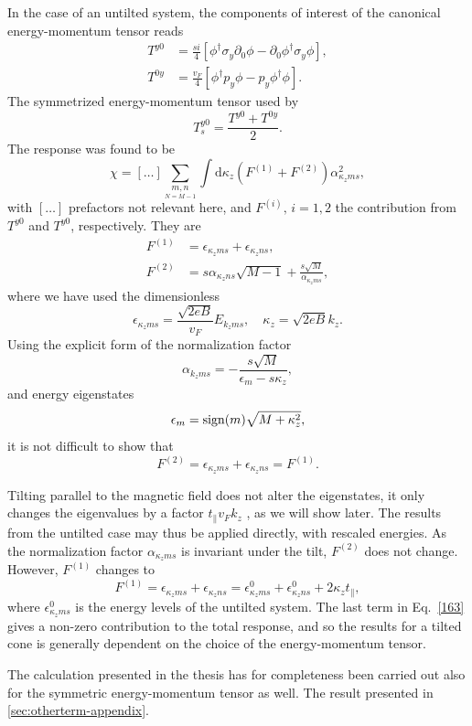 In the case of an untilted system, the components of interest of the canonical energy-momentum tensor reads
\begin{subequations}
\begin{align}
  T^{y 0} &= \frac{s i}{4}
  \left[
  \phi^{\dagger} \sigma_y \partial_{0} \phi - \partial_0 \phi^{\dagger} \sigma_y \phi
  \right],\\
  T^{0 y} &= \frac{v_F}{4}
  \left[
  \phi^{\dagger} p_y \phi - p_y \phi^{\dagger} \phi
  \right].
\end{align}
\end{subequations}
The symmetrized energy-momentum tensor used by \textcite{arjonaFingerprintsConformalAnomaly2019}
\begin{equation}
  T_s^{y 0} = \frac{T^{y 0} + T^{0 y}}{2}.
\end{equation}
The response was found to be
\begin{equation}
  \chi = [\dots] \sum\limits_{\underset{N=M-1}{m,n}}^{} \int \mathrm{d} \kappa_z (F^{(1)} + F^{(2)}) \alpha_{\kappa_z m s}^2,
\end{equation}
with \( [\dots] \) prefactors not relevant here, and \( F^{(i)},\, i=1,2 \) the contribution from \( T^{y0} \) and \( T^{y 0} \), respectively.
They are
\begin{align}
  F^{(1)} &= \epsilon_{\kappa_z m s} + \epsilon_{\kappa_z n s},\\
  F^{(2)} &= s \alpha_{\kappa_z n s} \sqrt{M-1} + \frac{s \sqrt{M}}{\alpha_{\kappa_z m s}},
\end{align}
where we have used the dimensionless
\[
  \epsilon_{\kappa_z m s} = \frac{\sqrt{2eB}}{v_{F}} E_{k_z m s}, \quad \kappa_z = \sqrt{2 e B} k_z.
\]
Using the explicit form of the normalization factor
\[
  \alpha_{k_z m s} = - \frac{s \sqrt{M}}{\epsilon_{m} - s \kappa_z},
\]
and energy eigenstates
\[
  \epsilon_m = \operatorname{sign} (m) \sqrt{M + \kappa_{z}^2},
\]
it is not difficult to show that
\begin{equation}
  F^{(2)} = \epsilon_{\kappa_z m s} + \epsilon_{\kappa_z n s} = F^{(1)}.
\end{equation}

Tilting parallel to the magnetic field does not alter the eigenstates, it only changes the eigenvalues by a factor \( t_{\parallel} v_F k_z \) \cites{yuPredictedUnusualMagnetoresponse2016,tchoumakovMagneticFieldInducedRelativisticProperties2016}, as we will show later.
The results from the untilted case may thus be applied directly, with rescaled energies.
As the normalization factor \( \alpha_{\kappa_z m s} \) is invariant under the tilt, \( F^{(2)} \) does not change.
However, \( F^{(1)} \) changes to
\begin{equation}
  \label{eq:163}
  F^{(1)} = \epsilon_{\kappa_z m s} + \epsilon_{\kappa_z n s} = \epsilon^0_{\kappa_z m s} + \epsilon^0_{\kappa_z n s} + 2 \kappa_z t_{\parallel},
\end{equation}
where \( \epsilon^0_{\kappa_z m s} \) is the energy levels of the untilted system.
The last term in Eq.~\eqref{163} gives a non-zero contribution to the total response, and so the results for a tilted cone is generally dependent on the choice of the energy-momentum tensor.

The calculation presented in the thesis has for completeness been carried out also for the symmetric energy-momentum tensor as well.
The result presented in \cref{sec:otherterm-appendix}.


